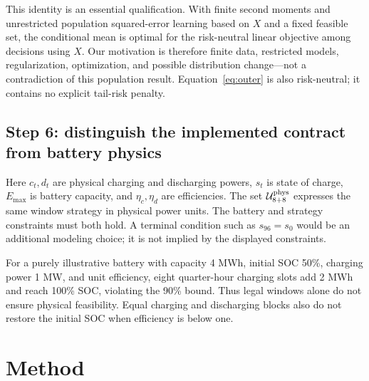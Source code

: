 \documentclass[11pt,a4paper]{article}
\begin{document}
\EqBayes
This identity is an essential qualification. With finite second moments and unrestricted population squared-error learning based on $X$ and a fixed feasible set, the conditional mean is optimal for the risk-neutral linear objective among decisions using $X$. Our motivation is therefore finite data, restricted models, regularization, optimization, and possible distribution change---not a contradiction of this population result. Equation~\eqref{eq:outer} is also risk-neutral; it contains no explicit tail-risk penalty.

\subsection{Step 6: distinguish the implemented contract from battery physics}
\EqPhysical
Here $c_t,d_t$ are physical charging and discharging powers, $s_t$ is state of charge, $E_{\max}$ is battery capacity, and $\eta_c,\eta_d$ are efficiencies. The set $\mathcal U_{8+8}^{\rm phys}$ expresses the same window strategy in physical power units. The battery and strategy constraints must both hold. A terminal condition such as $s_{96}=s_0$ would be an additional modeling choice; it is not implied by the displayed constraints.

For a purely illustrative battery with capacity 4 MWh, initial SOC 50\%, charging power 1 MW, and unit efficiency, eight quarter-hour charging slots add 2 MWh and reach 100\% SOC, violating the 90\% bound. Thus legal windows alone do not ensure physical feasibility. Equal charging and discharging blocks also do not restore the initial SOC when efficiency is below one.

\section{Method}
\end{document}
